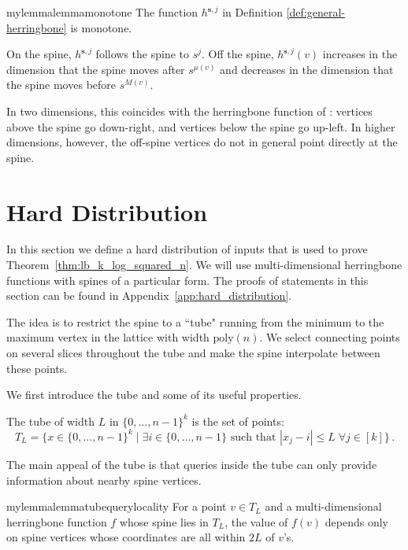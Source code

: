 \documentclass[11pt]{article}
\begin{document}
\begin{restatable}{mylemma}{lemmamonotone}
\label{lem:h-monotone}
    The function $h^{\mathbf{s}, j}$ in Definition \ref{def:general-herringbone} is monotone.
\end{restatable}

On the spine, $h^{\mathbf{s}, j}$ follows the spine to $s^j$. Off the spine, $h^{\mathbf{s}, j}(v)$ increases in the dimension that the spine moves after $s^{\mu(v)}$ and decreases in the dimension that the spine moves before $s^{M(v)}$. 

In two dimensions, this coincides with the herringbone function of \cite{etessami2019tarski}: vertices above the spine go down-right, and vertices below the spine go up-left. In higher dimensions, however, the off-spine vertices do not in general point directly at the spine.

\section{Hard Distribution} \label{sec:hard_distribution}

In this section we define a hard distribution of inputs that is used to prove Theorem~\ref{thm:lb_k_log_squared_n}. We will use multi-dimensional herringbone functions with spines of a particular form. The proofs of statements in this section can be found in Appendix~\ref{app:hard_distribution}.

The idea is to restrict the spine to a ``tube" running from the minimum to the maximum vertex in the lattice with width $\text{poly}(n)$. We select connecting points on several slices throughout the tube and make the spine interpolate between these points.

We first introduce the tube and some of its useful properties.

\begin{definition}[Tube]
    The tube of width $L$ in $\{0, \ldots, n-1\}^k$ is the set of points:
    \begin{equation}
        T_L = \{ x \in \{0, \ldots, n-1\}^k \mid  \exists i \in \{0, \ldots, n-1\} \text{ such that $|x_j - i| \leq L$} \;  \forall j \in [k]\}\,. \label{eq:condition_to_be_in_tube}
    \end{equation}
\end{definition}

The main appeal of the tube is that queries inside the tube can only provide information about nearby spine vertices.

\begin{restatable}{mylemma}{lemmatubequerylocality}
\label{lem:tube-query-locality}
     For a point $v \in T_L$ and a multi-dimensional herringbone function $f$ whose spine lies in $T_L$, the value of $f(v)$ depends only on spine vertices whose coordinates are all within $2L$ of $v$'s.
\end{restatable}
\end{document}
